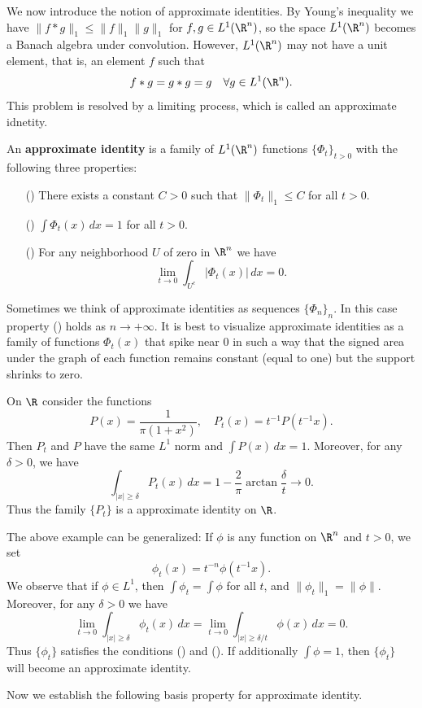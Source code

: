 We now introduce the notion of approximate identities. By Young's inequality we have $\|f\ast g\|_1\leq\|f\|_1\|g\|_1$ for $f,g\in L^1(\R^n)$, so the space $L^1(\R^n)$ becomes a Banach algebra under convolution. However, $L^1(\R^n)$ may not have a unit element, that is, an element $f$ such that
\[f\ast g=g\ast g=g\quad\forall g\in L^1(\R^n).\]
This problem is resolved by a limiting process, which is called an approximate idnetity.
\begin{definition}
An \textbf{approximate identity} is a family of $L^1(\R^n)$ functions $\{\Phi_t\}_{t>0}$ with the following three properties:
\begin{itemize}
\item[(\rmnum{1})] There exists a constant $C>0$ such that $\|\Phi_t\|_1\leq C$ for all $t>0$.
\item[(\rmnum{2})] $\int\Phi_t(x)\,dx=1$ for all $t>0$.
\item[(\rmnum{3})] For any neighborhood $U$ of zero in $\R^n$ we have
\[\lim_{t\to 0}\int_{U^c}|\Phi_t(x)|\,dx=0.\] 
\end{itemize}
\end{definition}
Sometimes we think of approximate identities as sequences $\{\Phi_n\}_n$. In this case property () holds as $n\to+\infty$. It is best to visualize approximate identities as a family of functions $\Phi_t(x)$ that spike near $0$ in such a way that the signed area under the graph of each function remains constant (equal to one) but the support shrinks to zero.
\begin{example}
On $\R$ consider the functions
\[P(x)=\frac{1}{\pi(1+x^2)},\quad P_t(x)=t^{-1}P(t^{-1}x).\]
Then $P_t$ and $P$ have the same $L^1$ norm and $\int P(x)\,dx=1$. Moreover, for any $\delta>0$, we have
\[\int_{|x|\geq\delta}P_t(x)\,dx=1-\frac{2}{\pi}\arctan\frac{\delta}{t}\to 0.\]
Thus the family $\{P_t\}$ is a approximate identity on $\R$.
\end{example}
The above example can be generalized: If $\phi$ is any function on $\R^n$ and $t>0$, we set
\[\phi_t(x)=t^{-n}\phi(t^{-1}x).\]
We observe that if $\phi\in L^1$, then $\int\phi_t=\int\phi$ for all $t$, and $\|\phi_t\|_1=\|\phi\|$. Moreover, for any $\delta>0$ we have
\[\lim_{t\to 0}\int_{|x|\geq\delta}\phi_t(x)\,dx=\lim_{t\to 0}\int_{|x|\geq\delta/t}\phi(x)\,dx=0.\]
Thus $\{\phi_t\}$ satisfies the conditions () and (). If additionally $\int\phi=1$, then $\{\phi_t\}$ will become an approximate identity.\par
Now we establish the following basis property for approximate identity.
